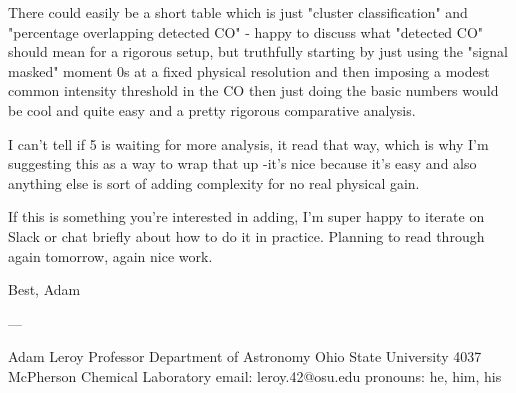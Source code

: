There could easily be a short table which is just "cluster classification" and "percentage  overlapping detected CO" - happy to discuss what "detected CO" should mean for a rigorous setup, but truthfully starting by just using the "signal masked" moment 0s at a fixed physical resolution and then imposing a modest common intensity threshold in the CO then just doing the basic numbers would be cool and quite easy and a pretty rigorous comparative analysis.

I can't tell if 5 is waiting for more analysis, it read that way, which is why I'm suggesting this as a way to wrap that up -it's nice because it's easy and also anything else is sort of adding complexity for no real physical gain.

If this is something you're interested in adding, I'm super happy to iterate on Slack or chat briefly about how to do it in practice.
Planning to read through again tomorrow, again nice work.
 
Best,
Adam
 
---
 
Adam Leroy
Professor
Department of Astronomy
Ohio State University
4037 McPherson Chemical Laboratory
email: leroy.42@osu.edu
pronouns: he, him, his
 
